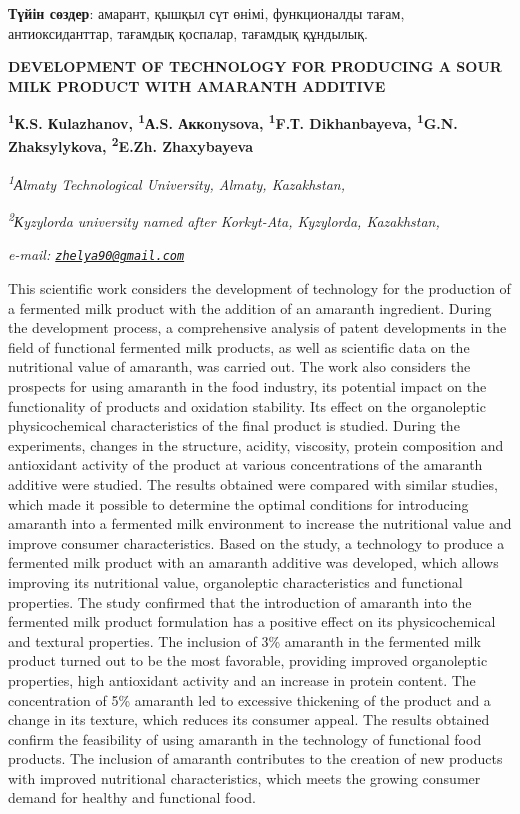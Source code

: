 {\bfseries Түйін сөздер}: амарант, қышқыл сүт өнімі, функционалды тағам,
антиоксиданттар, тағамдық қоспалар, тағамдық құндылық.

\begin{articleheader}
{\bfseries DEVELOPMENT OF TECHNOLOGY FOR PRODUCING A SOUR MILK PRODUCT WITH AMARANTH ADDITIVE}

{\bfseries
\textsuperscript{1}К.S. Кulazhanov,
\textsuperscript{1}А.S. Аккonysova\textsuperscript{\envelope },
\textsuperscript{1}F.Т. Dikhanbayeva,
\textsuperscript{1}G.N. Zhaksylykova,
\textsuperscript{2}E.Zh. Zhaxybayeva}
\end{articleheader}

\begin{affiliation}
\emph{\textsuperscript{1}Аlmaty Technological University, Almaty, Kazakhstan,}

\emph{\textsuperscript{2}Кyzylorda university named after Korkyt-Ata, Kyzylorda, Kazakhstan,}

\emph{e-mail: \href{mailto:zhelya90@gmail.com}{\nolinkurl{zhelya90@gmail.com}}}
\end{affiliation}

This scientific work considers the development of technology for the
production of a fermented milk product with the addition of an amaranth
ingredient. During the development process, a comprehensive analysis of
patent developments in the field of functional fermented milk products,
as well as scientific data on the nutritional value of amaranth, was
carried out. The work also considers the prospects for using amaranth in
the food industry, its potential impact on the functionality of products
and oxidation stability. Its effect on the organoleptic physicochemical
characteristics of the final product is studied. During the experiments,
changes in the structure, acidity, viscosity, protein composition and
antioxidant activity of the product at various concentrations of the
amaranth additive were studied. The results obtained were compared with
similar studies, which made it possible to determine the optimal
conditions for introducing amaranth into a fermented milk environment to
increase the nutritional value and improve consumer characteristics.
Based on the study, a technology to produce a fermented milk product
with an amaranth additive was developed, which allows improving its
nutritional value, organoleptic characteristics and functional
properties. The study confirmed that the introduction of amaranth into
the fermented milk product formulation has a positive effect on its
physicochemical and textural properties. The inclusion of 3\% amaranth
in the fermented milk product turned out to be the most favorable,
providing improved organoleptic properties, high antioxidant activity
and an increase in protein content. The concentration of 5\% amaranth
led to excessive thickening of the product and a change in its texture,
which reduces its consumer appeal. The results obtained confirm the
feasibility of using amaranth in the technology of functional food
products. The inclusion of amaranth contributes to the creation of new
products with improved nutritional characteristics, which meets the
growing consumer demand for healthy and functional food.

